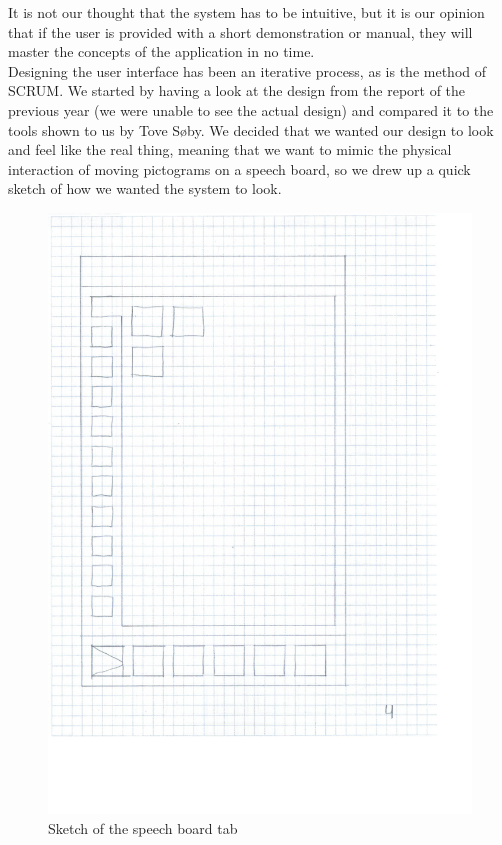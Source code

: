 It is not our thought that the system has to be intuitive, but it is our opinion that if the user is provided with a short demonstration or manual, they will master the concepts of the application in no time.\newline
\\
Designing the user interface has been an iterative process, as is the method of SCRUM. We started by having a look at the design from the report of the previous year (we were unable to see the actual design) and compared it to the tools shown to us by Tove S\o{}by.\newline%
We decided that we wanted our design to look and feel like the real thing, meaning that we want to mimic the physical interaction of moving pictograms on a speech board, so we drew up a quick sketch of how we wanted the system to look.\newline
\begin{figure}[htbp]
	\centering
		\includegraphics[scale=0.18]{input/images/speechboard_sketch.PNG}
		\caption{Sketch of the speech board tab}
	\label{fig:speechboard_sketch}
\end{figure}
